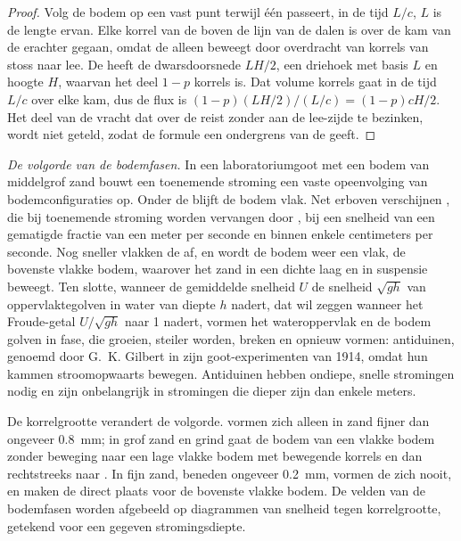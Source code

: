 \begin{proof}
Volg de bodem op een vast punt terwijl één  passeert, in de tijd $L/c$, $L$ is de lengte ervan. Elke korrel van de  boven de lijn van de dalen is over de kam van de  erachter gegaan, omdat de  alleen beweegt door overdracht van korrels van stoss naar lee. De  heeft de dwarsdoorsnede $LH/2$, een driehoek met basis $L$ en hoogte $H$, waarvan het deel $1 - p$ korrels is. Dat volume korrels gaat in de tijd $L/c$ over elke kam, dus de flux is $(1-p)(LH/2)/(L/c) = (1-p)cH/2$. Het deel van de vracht dat over de  reist zonder aan de lee-zijde te bezinken, wordt niet geteld, zodat de formule een ondergrens van de  geeft.
\end{proof}

\emph{De volgorde van de bodemfasen.} In een laboratoriumgoot met een bodem van middelgrof zand bouwt een toenemende stroming een vaste opeenvolging van bodemconfiguraties op. Onder de  blijft de bodem vlak. Net erboven verschijnen , die bij toenemende stroming worden vervangen door , bij een snelheid van een gematigde fractie van een meter per seconde en binnen enkele centimeters per seconde. Nog sneller vlakken de  af, en wordt de bodem weer een vlak, de bovenste vlakke bodem, waarover het zand in een dichte laag en in suspensie beweegt. Ten slotte, wanneer de gemiddelde snelheid $U$ de snelheid $\sqrt{gh}$ van oppervlaktegolven in water van diepte $h$ nadert, dat wil zeggen wanneer het Froude-getal $U/\sqrt{gh}$ naar 1 nadert, vormen het wateroppervlak en de bodem golven in fase, die groeien, steiler worden, breken en opnieuw vormen: antiduinen, genoemd door G.~K. Gilbert in zijn goot-experimenten van 1914, omdat hun kammen stroomopwaarts bewegen. Antiduinen hebben ondiepe, snelle stromingen nodig en zijn onbelangrijk in stromingen die dieper zijn dan enkele meters.

De korrelgrootte verandert de volgorde.  vormen zich alleen in zand fijner dan ongeveer \qty{0.8}{mm}; in grof zand en grind gaat de bodem van een vlakke bodem zonder beweging naar een lage vlakke bodem met bewegende korrels en dan rechtstreeks naar . In fijn zand, beneden ongeveer \qty{0.2}{mm}, vormen de  zich nooit, en maken de  direct plaats voor de bovenste vlakke bodem. De velden van de bodemfasen worden afgebeeld op diagrammen van snelheid tegen korrelgrootte, getekend voor een gegeven stromingsdiepte.

